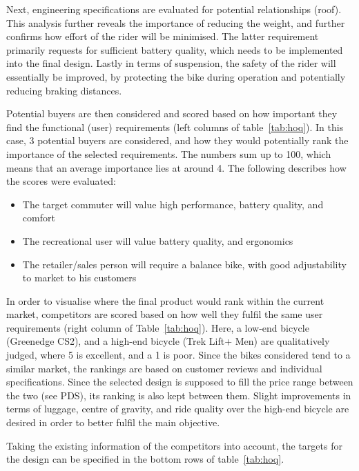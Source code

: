 \documentclass[a4paper,11pt]{article}
\begin{document}
Next, engineering specifications are evaluated for potential relationships (roof). This analysis further reveals the importance of reducing the weight, and further confirms how effort of the rider will be minimised. The latter requirement primarily requests for sufficient battery quality, which needs to be implemented into the final design. Lastly in terms of suspension, the safety of the rider will essentially be improved, by protecting the bike during operation and potentially reducing braking distances.

Potential buyers are then considered and scored based on how important they find the functional (user) requirements (left columns of table~\ref{tab:hoq}). In this case, 3 potential buyers are considered, and how they would potentially rank the importance of the selected requirements. The numbers sum up to 100, which means that an average importance lies at around 4. The following describes how the scores were evaluated:
\begin{itemize}
	\setlength{\itemsep}{0pt}
	\item The target commuter will value high performance, battery quality, and comfort
	\item The recreational user will value battery quality, and ergonomics
	\item The retailer/sales person will require a balance bike, with good adjustability to market to his customers
\end{itemize}

In order to visualise where the final product would rank within the current market, competitors are scored based on how well they fulfil the same user requirements (right column of Table~\ref{tab:hoq}). Here, a low-end bicycle (Greenedge CS2), and a high-end bicycle (Trek Lift+ Men) are qualitatively judged, where 5 is excellent, and a 1 is poor. Since the bikes considered tend to a similar market, the rankings are based on customer reviews and individual specifications. Since the selected design is supposed to fill the price range between the two (see PDS), its ranking is also kept between them. Slight improvements in terms of luggage, centre of gravity, and ride quality over the high-end bicycle are desired in order to better fulfil the main objective.

Taking the existing information of the competitors into account, the targets for the design can be specified in the bottom rows of table~\ref{tab:hoq}.

\newpage
\end{document}
